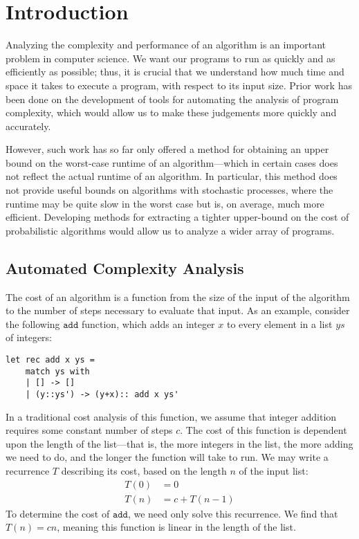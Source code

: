 \chapter{Introduction}
Analyzing the complexity and performance of an algorithm is an important problem in computer science. We want our programs to run as quickly and as efficiently as possible; thus, it is crucial that we understand how much time and space it takes to execute a program, with respect to its input size. Prior work has been done on the development of tools
for automating the analysis of program complexity, which would allow us to make these judgements more quickly and accurately. 

However, such work has so far only offered a method for obtaining an upper bound on the worst-case runtime of an algorithm---which in certain cases does not reflect the actual runtime of an algorithm. In particular, this method does not
provide useful bounds on algorithms with stochastic processes, where the runtime may be quite slow in the worst case but
is, on average, much more efficient. Developing methods for extracting a tighter upper-bound on the cost of probabilistic algorithms would allow us to analyze a wider array of programs.

\section{Automated Complexity Analysis}

The cost of an algorithm is a function from the size of the input of the algorithm to the number of steps necessary to evaluate 
that input. As an example, consider the following $\texttt{add}$ function, which adds an integer $x$ to every element 
in a list $ys$ of integers:
\begin{verbatim}
let rec add x ys =
	match ys with
	| [] -> []
	| (y::ys') -> (y+x):: add x ys'
\end{verbatim}
In a traditional cost analysis of this function, we assume that integer addition requires some constant number of steps $c$. The cost of this function is dependent upon the length of the list---that is, the more integers in the list, the more adding we need to
do, and the longer the function will take to run. We may write a recurrence $T$ describing its cost, based on the length
$n$ of the input list:
\begin{align*}
T(0) &= 0 \\
T(n) &= c + T(n-1)
\end{align*}
To determine the cost of $\texttt{add}$, we need only solve this recurrence. We find that $T(n) = cn$, meaning this function
is linear in the length of the list. 

